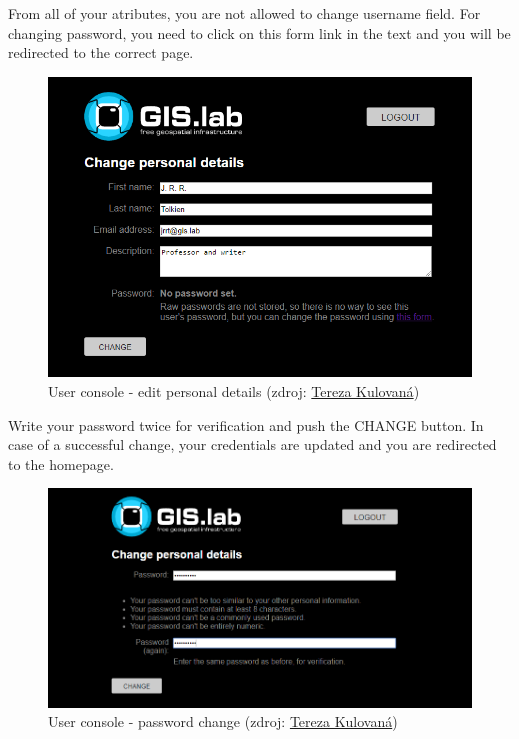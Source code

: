 From all of your atributes, you are not allowed to change
\textsf{username} field. For changing password, you need to click on
\textsf{this form} link in the text and you will be redirected to the
correct page.
\begin{figure}[H] \centering
    \includegraphics[width=430pt]{./prilohy/guide-user-change.png}
    \caption[User console - edit personal details]{User console - edit personal details (zdroj:
	\href{}{Tereza Kulovaná})}
	\label{fig:guide-user-change}
\end{figure}

Write your password twice for verification and push the
\textsf{CHANGE} button. In case of a successful change, your
credentials are updated and you are redirected to the homepage.
\begin{figure}[H] \centering
    \includegraphics[width=430pt]{./prilohy/guide-user-password.png}
    \caption[User console - password change]{User console - password change (zdroj:
	\href{}{Tereza Kulovaná})}
	\label{fig:guide-user-password}
\end{figure}

